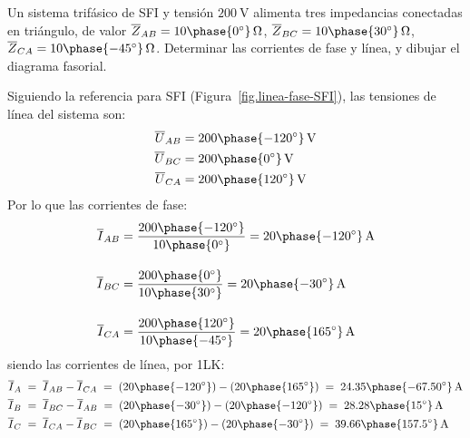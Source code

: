 	\vspace{4mm}
	\begin{example}\label{ej.3-3}
	    Un sistema trifásico de SFI y tensión $\qty{200}{\volt}$ alimenta tres impedancias conectadas en triángulo, de valor $\overline{Z}_{AB}=10\phase{0^\circ}\,\Omega$, $\overline{Z}_{BC}=10\phase{30^\circ}\,\Omega$, $\overline{Z}_{CA}=10\phase{-45^\circ}\,\Omega$. Determinar las corrientes de fase y línea, y dibujar el diagrama fasorial.

        \vspace{1mm}
	    \hspace*{-5mm}\hrulefill
        
        \vspace{4mm}
	    
	    Siguiendo la referencia para SFI (Figura~\ref{fig.linea-fase-SFI}), las tensiones de línea del sistema son:
	    \begin{align*}
	        \overline{U}_{AB}&=200\phase{-120^\circ}\,\si{\volt}\\
	        \overline{U}_{BC}&=200\phase{0^\circ}\,\si{\volt}\\
	        \overline{U}_{CA}&=200\phase{120^\circ}\,\si{\volt}
	    \end{align*}
	    Por lo que las corrientes de fase:
	    \begin{align*}
	        \overline{I}_{AB} &= \frac{200\phase{-120^\circ}}{10\phase{0^\circ}} =20\phase{-120^\circ}\,\si{\ampere} \\[10pt]
          \overline{I}_{BC} &= \frac{200\phase{0^\circ}}{10\phase{30^\circ}} = 20\phase{-30^\circ}\,\si{\ampere}\\[10pt]
          \overline{I}_{CA} &=\frac{200\phase{120^\circ}}{10\phase{-45^\circ}} = 20\phase{165^\circ}\,\si{\ampere}
	    \end{align*}
	    siendo las corrientes de línea, por 1LK:
	    \begin{align*}
         \overline{I}_A \; &= \; \overline{I}_{AB} - \overline{I}_{CA} \;=\; (20\phase{-120^\circ})-(20\phase{165^\circ}) \;=\; 24.35\phase{-67.50^\circ}\,\si{\ampere}\\	        
         \overline{I}_B \; &= \; \overline{I}_{BC} - \overline{I}_{AB} \;=\; (20\phase{-30^\circ})-(20\phase{-120^\circ}) \;=\; 28.28\phase{15^\circ}\,\si{\ampere}\\
        \overline{I}_C \; &= \; \overline{I}_{CA} - \overline{I}_{BC} \;=\; (20\phase{165^\circ})-(20\phase{-30^\circ}) \;=\; 39.66\phase{157.5^\circ}\,\si{\ampere}
        \end{align*}

\end{example}
